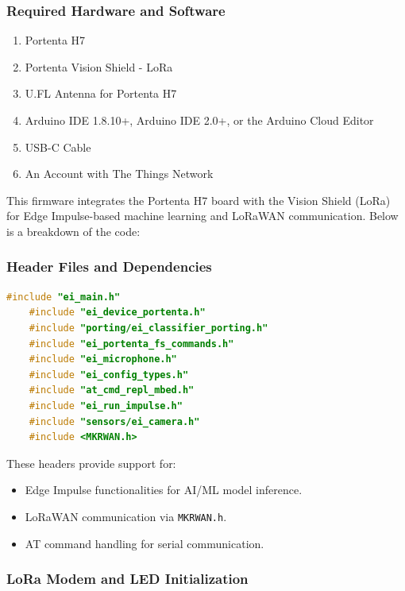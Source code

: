 \subsubsection{Required Hardware and Software}

\begin{enumerate}
	\item Portenta H7
	\item Portenta Vision Shield - LoRa
	\item U.FL Antenna for Portenta H7 
	\item Arduino IDE 1.8.10+, Arduino IDE 2.0+, or the Arduino Cloud Editor
	\item USB-C Cable
	\item An Account with The Things Network \cite{edge_impulse_portenta_lorawan:2025}
\end{enumerate}

This firmware integrates the Portenta H7 board with the Vision Shield (LoRa) for Edge Impulse-based machine learning and LoRaWAN communication. Below is a breakdown of the code: \cite{edge_impulse_portenta_lorawan:2025}

\subsubsection{Header Files and Dependencies}

\begin{lstlisting}[language=C++, caption=Included Header Files]
	#include "ei_main.h"
	#include "ei_device_portenta.h"
	#include "porting/ei_classifier_porting.h"
	#include "ei_portenta_fs_commands.h"
	#include "ei_microphone.h"
	#include "ei_config_types.h"
	#include "at_cmd_repl_mbed.h"
	#include "ei_run_impulse.h"
	#include "sensors/ei_camera.h"
	#include <MKRWAN.h>
\end{lstlisting}

These headers provide support for:
\begin{itemize}
	\item Edge Impulse functionalities for AI/ML model inference.
	\item LoRaWAN communication via \texttt{MKRWAN.h}.
	\item AT command handling for serial communication.
\end{itemize}

\subsubsection{LoRa Modem and LED Initialization}

